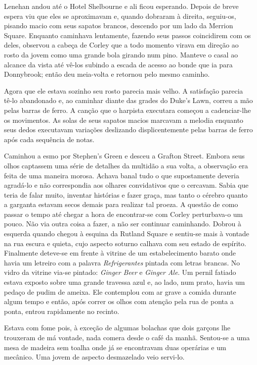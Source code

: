 Lenehan andou até o Hotel Shelbourne e ali ficou esperando.  Depois de breve
espera viu que eles se aproximavam e, quando dobraram à direita, seguiu-os,
pisando macio com seus sapatos brancos, descendo por um lado da Merrion Square.
Enquanto caminhava lentamente, fazendo seus passos coincidirem com os deles,
observou a cabeça de Corley que a todo momento virava em direção ao rosto da
jovem como uma grande bola girando num pino.  Manteve o casal ao alcance da
vista até vê-los subindo a escada de acesso ao bonde que ia para Donnybrook;
então deu meia-volta e retornou pelo mesmo caminho.

Agora que ele estava sozinho seu rosto parecia mais velho.  A satisfação
parecia tê-lo abandonado e, ao caminhar diante das grades do Duke’s Lawn,
correu a mão pelas barras de ferro.  A canção que o harpista executara começou
a cadenciar-lhe os movimentos.  As solas de seus sapatos macios marcavam a
melodia enquanto seus dedos executavam variações deslizando displicentemente
pelas barras de ferro após cada sequência de notas.

Caminhou a esmo por Stephen’s Green e desceu a Grafton Street.  Embora seus
olhos captassem uma série de detalhes da multidão a sua volta, a observação era
feita de uma maneira morosa.  Achava banal tudo o que supostamente deveria
agradá-lo e não correspondia aos olhares convidativos que o cercavam.  Sabia
que teria de falar muito, inventar histórias e fazer graça, mas tanto o cérebro
quanto a garganta estavam secos demais para realizar tal proeza.  A questão de
como passar o tempo até chegar a hora de encontrar-se com Corley perturbava-o
um pouco.  Não via outra coisa a fazer, a não ser continuar caminhando.  Dobrou
à esquerda quando chegou à esquina da Rutland Square e sentiu-se mais à vontade
na rua escura e quieta, cujo aspecto soturno calhava com seu estado de
espírito.  Finalmente deteve-se em frente à vitrine de um estabelecimento
barato onde havia um letreiro com a palavra \textit{Refrigerantes} pintada com
letras brancas.  No vidro da vitrine via-se pintado: \textit{Ginger Beer} e
\textit{Ginger Ale}.  Um pernil fatiado estava exposto sobre uma grande
travessa azul e, ao lado, num prato, havia um pedaço de pudim de ameixa.  Ele
contemplou com ar grave a comida durante algum tempo e então, após correr os
olhos com atenção pela rua de ponta a ponta, entrou rapidamente no recinto.

Estava com fome pois, à exceção de algumas bolachas que dois garçons lhe
trouxeram de má vontade, nada comera desde o café da manhã.  Sentou-se a uma
mesa de madeira sem toalha onde já se encontravam duas operárias e um mecânico.
Uma jovem de aspecto desmazelado veio servi-lo.

